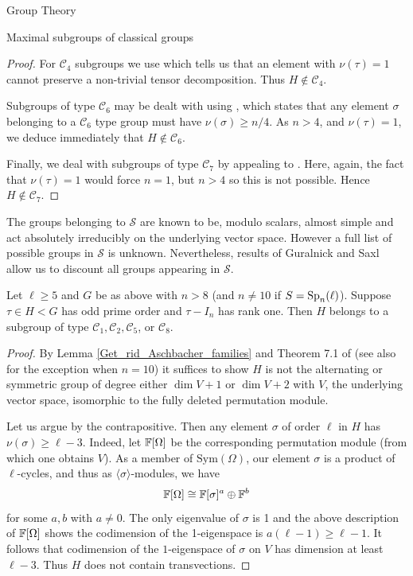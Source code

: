 \documentclass[11pt,a4paper]{article}
\newcommand{\C}{\mathcal{C}}
\begin{document}
\begin{section}{Group Theory}
\begin{subsection}{Maximal subgroups of classical groups}
\begin{proof}
For $\C_4$ subgroups we use \cite[Lemma 3.7]{Liebeck_Shalev} which tells us that an element with $\nu(\tau)=1$ cannot preserve a non-trivial tensor decomposition. Thus $H \not \in \C_4$.

Subgroups of type $\C_6$ may be dealt with using \cite[Lemma 6.3]{Burness_II}, which states that any element $\sigma$ belonging to a $\C_6$ type group must have $\nu(\sigma) \geq n/4$. As $n>4$, and $\nu(\tau) = 1$, we deduce immediately that $H \not \in \C_6$.

Finally, we deal with subgroups of type $\C_7$ by appealing to \cite[Lemma 7.1]{Burness_II}. Here, again, the fact that $\nu(\tau)=1$ would force $n=1$, but $n>4$ so this is not possible. Hence $H \not \in \C_7$.
\end{proof}

The groups belonging to $\mathcal{S}$ are known to be, modulo scalars, almost simple and act absolutely irreducibly on the underlying vector space. However a full list of possible groups in $\mathcal{S}$ is unknown. Nevertheless, results of Guralnick and Saxl \cite{Guralnick_Saxl} allow us to discount all groups appearing in $\mathcal{S}$.


\begin{lemma}
Let $\ell \geq 5$ and $G$ be as above with $n > 8$ (and $n \neq 10$ if $S= \Sp_n(\ell)$). Suppose $\tau \in H < G$ has odd prime order and $\tau - I_n$ has rank one. Then $H$ belongs to a subgroup of type $\C_1, \C_2, \C_5$, or $\C_8$.
\end{lemma}

\begin{proof}
By Lemma \ref{Get_rid_Aschbacher_families} and Theorem 7.1 of \cite{Guralnick_Saxl} (see also \cite[Table 2.3]{Burness_IV} for the exception when $n=10$) it suffices to show $H$ is not the alternating or symmetric group of degree either $\dim V + 1$ or $\dim V +2$ with $V$, the underlying vector space, isomorphic to the fully deleted permutation module.

Let us argue by the contrapositive.
Then any element $\sigma$ of order $\ell$ in $H$ has $\nu(\sigma) \geq \ell-3$.
Indeed, let $\mathbb{F}[\Omega]$ be the corresponding permutation module (from which one obtains $V$).
As a member of $\mathrm{Sym}(\Omega)$, our element $\sigma$ is a product of $\ell$-cycles, and thus as $\langle\sigma\rangle$-modules, we have
$$\mathbb{F}[\Omega] \cong \mathbb{F}[\sigma]^a \oplus \mathbb{F}^b $$
for some $a,b$ with $a\neq 0$.
The only eigenvalue of $\sigma$ is 1 and the above description of $\mathbb{F}[\Omega]$ shows the codimension of the 1-eigenspace is $ a(\ell-1) \geq \ell-1$.
It follows that codimension of the $1$-eigenspace of $\sigma$ on $V$ has dimension at least $\ell-3$.
Thus $H$ does not contain transvections.


\end{proof}
\end{subsection}
\end{section}
\end{document}
